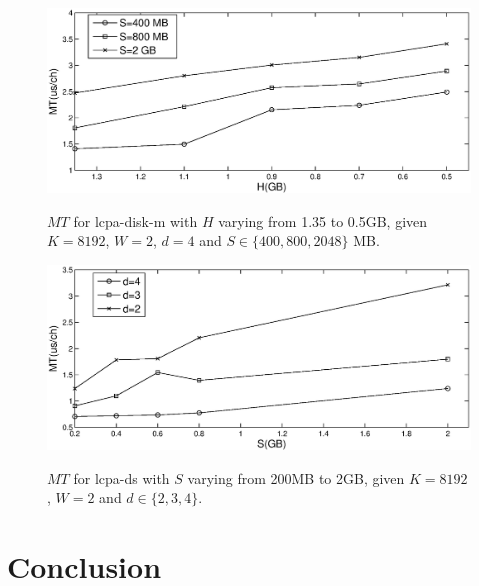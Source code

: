 \documentclass{llncs}
\begin{document}
\begin{figure}[t]
\centering
\includegraphics[width=1\textwidth]{stxxl_pq_impact.eps}\\
\caption{$MT$ for lcpa-disk-m with $H$ varying from 1.35 to 0.5GB, given $K=8192$, $W=2$, $d=4$ and $S \in \{400, 800, 2048\}$ MB.}
\label{fig:stxxl_pq_impact}
\end{figure}



\begin{figure}[t]
\centering
\includegraphics[width=1\textwidth]{ds_varying_n.eps}\\
\caption{$MT$ for lcpa-ds with $S$ varying from 200MB to 2GB, given $K=8192$, $W=2$ and $d \in \{2,3,4\}$.}
\label{fig:ds_varying_n}
\end{figure}


\section{Conclusion}\label{sec:conclusion}
\end{document}
